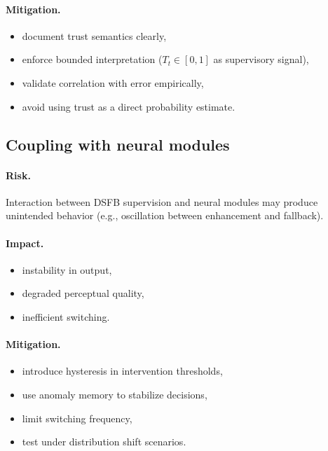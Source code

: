 \documentclass[11pt,letterpaper]{article}
\theoremstyle{gcresult}
\theoremstyle{definition}
\begin{document}
\paragraph{Mitigation.}
\begin{itemize}[leftmargin=1.5em]
    \item document trust semantics clearly,
    \item enforce bounded interpretation ($T_t\in[0,1]$ as supervisory signal),
    \item validate correlation with error empirically,
    \item avoid using trust as a direct probability estimate.
\end{itemize}


\subsection{Coupling with neural modules}

\paragraph{Risk.}
Interaction between DSFB supervision and neural modules may produce unintended behavior (e.g., oscillation between enhancement and fallback).

\paragraph{Impact.}
\begin{itemize}[leftmargin=1.5em]
    \item instability in output,
    \item degraded perceptual quality,
    \item inefficient switching.
\end{itemize}

\paragraph{Mitigation.}
\begin{itemize}[leftmargin=1.5em]
    \item introduce hysteresis in intervention thresholds,
    \item use anomaly memory to stabilize decisions,
    \item limit switching frequency,
    \item test under distribution shift scenarios.
\end{itemize}
\end{document}
